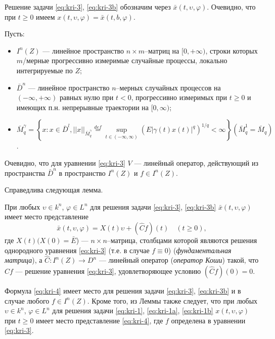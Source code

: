 Решение задачи \eqref{eq:kri-3}, \eqref{eq:kri-3b} обозначим через  $\bar x(t, \upsilon,
\varphi )$. Очевидно, что при $t   \geq 0$ имеем $x(t, \upsilon,
\varphi ) = \bar x(t, b, \varphi )$.

Пусть:
\begin{itemize}
    \item $I^n(Z)$ --- линейное пространство $n\times m$--матриц на $[0,
    +\infty )$, строки которых $m$\-/мерные прогрессивно измеримые
    случайные процессы, локально интегрируемые по $Z$;

    \item $\bar D^n$ --- линейное пространство $n$--мерных случайных процессов на $(-\infty ,
    +\infty )$ равных нулю при $t < 0$, прогрессивно измеримых при $t
    \geq 0$ и имеющих п.н. непрерывные траектории на  $[0, \infty )$;

    \item $\bar M_q^{\gamma } = \left \{x: x \in \bar D^l, ||x||_{\bar M_q^\gamma }
     \mathrel
     {\mathop {=} \limits ^{def}} \mathrel {\mathop {\sup}
     \limits _{t \in (-\infty, \infty )}} (E|\gamma (t)x(t)|^q)^{1/q} < \infty \right \}  (
     \bar M_q^1 = \bar M_q)$.
\end{itemize}

Очевидно, что  для уравнении \eqref{eq:kri-3} $V$  --- линейный оператор,
действующий из пространства $\bar D^n$ в пространство $I^n(Z)$ и $f
\in  I^n(Z)$.

Справедлива следующая  лемма.

\begin{lemma}\label{lem:kri-1}
    При любых  $\upsilon \in k^n$, $\varphi \in L^n$
    для решения задачи \eqref{eq:kri-3}, \eqref{eq:kri-3b}  $\bar x(t, \upsilon, \varphi)$ имеет
    место представление
    \begin{equation}
    \label{eq:kri-4}
    \bar x(t,\upsilon , \varphi) = X(t)\upsilon +(\hat Cf)(t)\quad (t
    \ge 0),
    \end{equation}
    где $X(t)(X(0) = \bar E$) --- $n \times n$--матрица, столбцами
    которой являются решения однородного уравнения \eqref{eq:kri-3} (т.е. в случае $f
    \equiv 0$) ({\it фундаментальная матрица}), а $\hat C:I^n(Z)
    \rightarrow D^n$
    --- линейный оператор ({\it оператор Коши}) такой, что
    $\hat Cf$ --- решение уравнения \eqref{eq:kri-3}, удовлетворяющее условию $(\hat
    Cf)(0) = 0$.
\end{lemma}

\begin{remark}\label{rem:kri-2}
    Формула \eqref{eq:kri-4} имеет место для решения задачи \eqref{eq:kri-3},
    \eqref{eq:kri-3b} и в случае любого  $f \in I^n(Z)$.  Кроме того, из Леммы также
    следует, что при любых  $\upsilon \in k^n$, $\varphi \in L^n$  для
    решения задачи \eqref{eq:kri-1}, \eqref{eq:kri-1a}, \eqref{eq:kri-1b}  $ x(t,\upsilon, \varphi)$ при $t\geq
    0$ имеет место представление \eqref{eq:kri-4}, где $f$ определена в уравнении
    \eqref{eq:kri-3}.
\end{remark}

